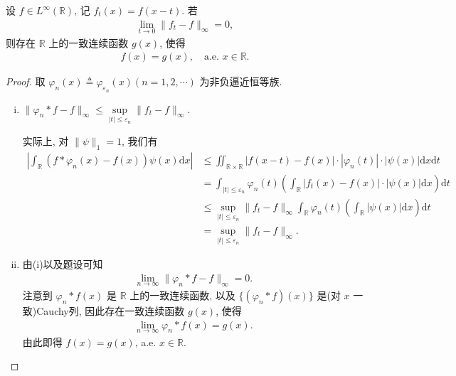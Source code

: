 \documentclass[../../main.tex]{subfiles}%
\begin{document}
\begin{example}
设 $f\in L^\infty(\mathbb{R})$, 记 $f_t(x)=f(x-t)$. 若
\begin{align*}
\lim\limits_{t\to 0} \|f_t - f\|_\infty = 0,
\end{align*}
则存在 $\mathbb{R}$ 上的一致连续函数 $g(x)$, 使得
\begin{align*}
f(x)=g(x), \quad \text{a.e. } x\in \mathbb{R}.
\end{align*}
\end{example}
\begin{proof}
取 $\varphi_n(x) \triangleq \varphi_{\varepsilon_n}(x)(n=1,2,\cdots)$ 为非负逼近恒等族.
\begin{enumerate}[(i)]
\item $\|\varphi_n * f - f\|_\infty \leqslant \sup\limits_{|t|\leqslant \varepsilon_n} \|f_t - f\|_\infty$.

实际上, 对 $\|\psi\|_1=1$, 我们有
\begin{align*}
\left| \int_{\mathbb{R}} (f*\varphi_n(x)-f(x))\psi(x) \mathrm{d}x \right|
&\leqslant \iint_{\mathbb{R}\times\mathbb{R}} |f(x-t)-f(x)| \cdot |\varphi_n(t)| \cdot |\psi(x)| \mathrm{d}x\mathrm{d}t \\
&= \int_{|t|\leqslant \varepsilon_n} \varphi_n(t) \left( \int_{\mathbb{R}} |f_t(x)-f(x)| \cdot |\psi(x)| \mathrm{d}x \right) \mathrm{d}t \\
&\leqslant \sup\limits_{|t|\leqslant \varepsilon_n} \|f_t - f\|_\infty \int_{\mathbb{R}} \varphi_n(t) \left( \int_{\mathbb{R}} |\psi(x)| \mathrm{d}x \right) \mathrm{d}t \\
&= \sup\limits_{|t|\leqslant \varepsilon_n} \|f_t - f\|_\infty.
\end{align*}

\item 由(i)以及题设可知
\begin{align*}
\lim\limits_{n\to\infty} \|\varphi_n * f - f\|_\infty = 0.
\end{align*}
注意到 $\varphi_n * f(x)$ 是 $\mathbb{R}$ 上的一致连续函数, 以及 $\{(\varphi_n * f)(x)\}$ 是(对 $x$ 一致)Cauchy列, 因此存在一致连续函数 $g(x)$, 使得
\begin{align*}
\lim\limits_{n\to\infty} \varphi_n * f(x) = g(x).
\end{align*}
由此即得 $f(x)=g(x)$, a.e. $x\in \mathbb{R}$.
\end{enumerate}
\end{proof}
\end{document}
